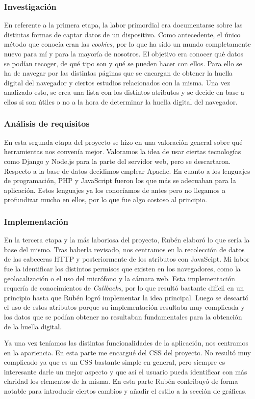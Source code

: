 \subsubsection{Investigación}
En referente a la primera etapa, la labor primordial era documentarse sobre las distintas formas de captar datos de un dispositivo. Como antecedente, el único método que conocía eran las \textit{cookies}, por lo que ha sido un mundo completamente nuevo para mí y para la mayoría de nosotros. El objetivo era conocer qué datos se podían recoger, de qué tipo son y qué se pueden hacer con ellos. Para ello se ha de navegar por las distintas páginas que se encargan de obtener la huella digital del navegador y ciertos estudios relacionados con la misma. Una vez analizado esto, se crea una lista con los distintos atributos y se decide en base a ellos si son útiles o no a la hora de determinar la huella digital del navegador.
\subsubsection{Análisis de requisitos}
En esta segunda etapa del proyecto se hizo en una valoración general sobre qué herramientas nos convenía mejor. Valoramos la idea de usar ciertas tecnologías como Django y Node.js para la parte del servidor web, pero se descartaron. Respecto a la base de datos decidimos emplear Apache. En cuanto a los lenguajes de programación, PHP y JavaScript fueron los que más se adecuaban para la aplicación. Estos lenguajes ya los conocíamos de antes pero no llegamos a profundizar mucho en ellos, por lo que fue algo costoso al principio.
\subsubsection{Implementación}
En la tercera etapa y la más laboriosa del proyecto, Rubén elaboró lo que sería la base del mismo. Tras haberla revisado, nos centramos en la recolección de datos de las cabeceras HTTP y posteriormente de los atributos con JavaScipt. Mi labor fue la identificar los distintos permisos que existen en los navegadores, como la geolocalización o el uso del micrófono y la cámara web. Esta implementación requería de conocimientos de \textit{Callbacks}, por lo que resultó bastante difícil en un principio hasta que Rubén logró implementar la idea principal. Luego se descartó el uso de estos atributos porque su implementación resultaba muy complicada y los datos que se podían obtener no resultaban fundamentales para la obtención de la huella digital.\par
Ya una vez teníamos las distintas funcionalidades de la aplicación, nos centramos en la apariencia. En esta parte me encargué del CSS del proyecto. No resultó muy complicado ya que es un CSS bastante simple en general, pero siempre es interesante darle un mejor aspecto y que así el usuario pueda identificar con más claridad los elementos de la misma. En esta parte Rubén contribuyó de forma notable para introducir ciertos cambios y añadir el estilo a la sección de gráficas. 
